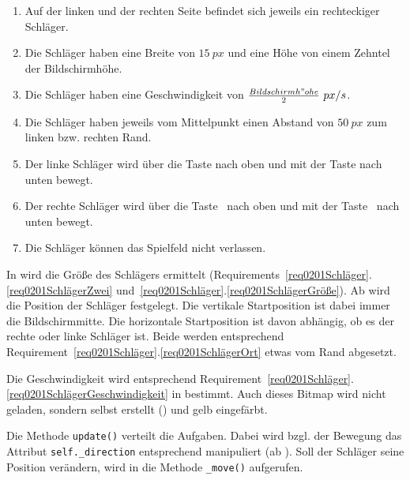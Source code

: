 \begin{enumerate}
	\item Auf der linken und der rechten Seite befindet sich jeweils ein rechteckiger Schläger.\label{req0201SchlägerZwei}
	\item Die Schläger haben eine Breite von $15~px$ und eine Höhe von einem Zehntel der Bildschirmhöhe.\label{req0201SchlägerGröße}
	\item Die Schläger haben eine Geschwindigkeit von $\frac{Bildschirmh"ohe}{2}~px/s$.\label{req0201SchlägerGeschwindigkeit}
	\item Die Schläger haben jeweils vom Mittelpunkt einen Abstand von $50~px$ zum linken bzw. rechten Rand.\label{req0201SchlägerOrt}
	\item Der linke Schläger wird über die Taste  nach oben und mit der Taste  nach unten bewegt.\label{req0201SchlägerTastenLinks}
	\item Der rechte Schläger wird über die Taste \UArrow\ nach oben und mit der Taste \DArrow\ nach unten bewegt.\label{req0201SchlägerTastenRechts}
	\item Die Schläger können das Spielfeld nicht verlassen.\label{req0201SchlägerGefangen}
\end{enumerate}
\er

In  wird die Größe des Schlägers ermittelt (Requirements~\ref{req0201Schläger}.\ref{req0201SchlägerZwei} und~\ref{req0201Schläger}.\ref{req0201SchlägerGröße}). Ab  wird die Position der Schläger festgelegt. Die vertikale Startposition ist dabei immer die Bildschirmmitte. Die horizontale Startposition ist davon abhängig, ob es der rechte oder linke Schläger ist. Beide werden entsprechend Requirement~\ref{req0201Schläger}.\ref{req0201SchlägerOrt} etwas vom Rand abgesetzt. 

Die Geschwindigkeit wird entsprechend Requirement~\ref{req0201Schläger}.\ref{req0201SchlägerGeschwindigkeit} in  bestimmt. Auch dieses Bitmap wird nicht geladen, sondern selbst erstellt () und gelb eingefärbt.


Die Methode \texttt{update()} verteilt die Aufgaben. Dabei wird bzgl. der Bewegung das Attribut \texttt{self.\_direction} entsprechend manipuliert (ab ). Soll der Schläger seine Position verändern, wird in  die Methode \texttt{\_move()} aufgerufen.

